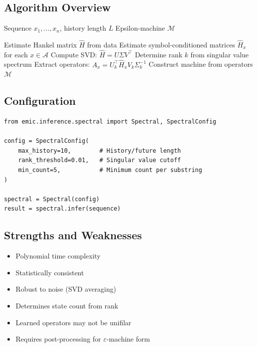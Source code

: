 \documentclass[11pt,a4paper]{report}
\theoremstyle{definition}
\theoremstyle{plain}
\newcommand{\eps}{\varepsilon}
\begin{document}
\subsection{Algorithm Overview}

\begin{algorithm}
\caption{Spectral Learning}
\begin{algorithmic}[1]
\Require Sequence $x_1, \ldots, x_n$, history length $L$
\Ensure Epsilon-machine $\mathcal{M}$

\State Estimate Hankel matrix $\hat{H}$ from data
\State Estimate symbol-conditioned matrices $\hat{H}_x$ for each $x \in \mathcal{A}$
\State Compute SVD: $\hat{H} = U \Sigma V^\top$
\State Determine rank $k$ from singular value spectrum
\State Extract operators: $A_x = U_k^\top \hat{H}_x V_k \Sigma_k^{-1}$
\State Construct machine from operators
\State \Return $\mathcal{M}$
\end{algorithmic}
\end{algorithm}

\subsection{Configuration}

\begin{lstlisting}[caption={Spectral configuration}]
from emic.inference.spectral import Spectral, SpectralConfig

config = SpectralConfig(
    max_history=10,        # History/future length
    rank_threshold=0.01,   # Singular value cutoff
    min_count=5,           # Minimum count per substring
)

spectral = Spectral(config)
result = spectral.infer(sequence)
\end{lstlisting}

\subsection{Strengths and Weaknesses}

\begin{itemize}
    \item[\checkmark] Polynomial time complexity
    \item[\checkmark] Statistically consistent
    \item[\checkmark] Robust to noise (SVD averaging)
    \item[\checkmark] Determines state count from rank
    \item[$\times$] Learned operators may not be unifilar
    \item[$\times$] Requires post-processing for $\eps$-machine form
\end{itemize}
\end{document}
